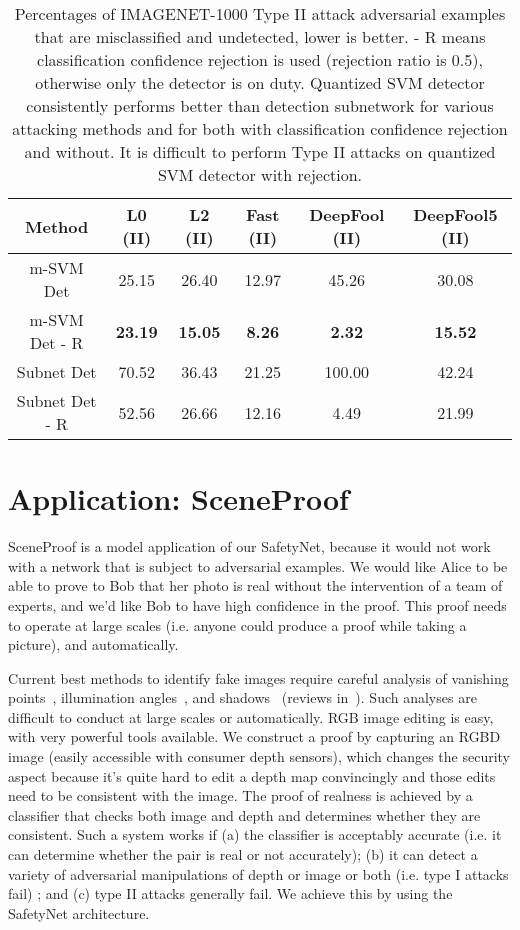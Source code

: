 \documentclass[10pt,twocolumn,letterpaper]{article}
\begin{document}
\begin{table*}[h!]
\begin{center}
\resizebox{0.65\textwidth}{!}
{
\begin{tabular}{  c | c | c | c | c | c }
Method & L0 (II) & L2 (II) & Fast (II) & DeepFool (II) & DeepFool5 (II)\\
\hline
m-SVM Det & 25.15 & 26.40 & 12.97 & 45.26 & 30.08 \\
m-SVM Det - R & \textbf{23.19} & \textbf{15.05} & \textbf{8.26} & \textbf{2.32} & \textbf{15.52} \\
Subnet Det & 70.52 & 36.43 & 21.25 & 100.00 & 42.24 \\
Subnet Det - R & 52.56 & 26.66 & 12.16 & 4.49 & 21.99 \\
\end{tabular}
}
\caption{Percentages of IMAGENET-1000 Type II attack adversarial examples that are misclassified and undetected, lower is better. - R means classification confidence rejection is used (rejection ratio is 0.5), otherwise only the detector is on duty. Quantized SVM detector consistently performs better than detection subnetwork for various attacking methods and for both with classification confidence rejection and without. It is difficult to perform Type II attacks on quantized SVM detector with rejection. }
\label{tb:summary2}
\end{center}
\end{table*}


\section{Application: SceneProof}
\label{sec:sceneproof}

SceneProof is a model application of our SafetyNet, because it would not work with a network that is subject to adversarial examples.
We would like Alice to be able to prove to Bob that her photo is real without the intervention of a team of experts, and
we'd like Bob to have high confidence in the proof.   This proof needs to operate at large scales (i.e. anyone could produce a proof while taking a picture), and automatically.  

Current best methods to identify fake images require careful analysis of vanishing points~\cite{farid},
illumination angles~\cite{o2012exposing}, and shadows~\cite{kee2013exposing} (reviews in~\cite{farid,farid1}).  
Such analyses are difficult to conduct at large scales or automatically. RGB image editing is easy, with very powerful
tools available. We construct a proof by capturing an RGBD image (easily accessible with consumer depth sensors), 
which changes the security aspect because it's quite hard to edit a depth map convincingly and those edits need to be consistent with the image. The
proof of realness is achieved by a classifier that checks both image and depth and determines whether they are
consistent.  Such a system works if (a) the classifier is acceptably accurate (i.e. it can determine whether the pair is
real or not accurately); (b) it can detect a variety of adversarial manipulations of depth or image or both (i.e. type I
attacks fail) ; and (c) type II attacks generally fail.   We achieve this by using the SafetyNet architecture.
\end{document}
